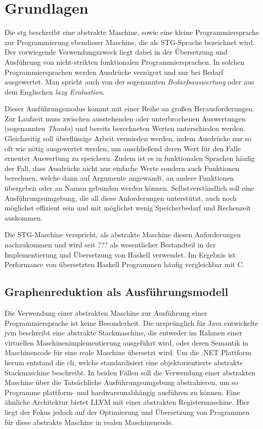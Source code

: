 
\chapter{Grundlagen}\label{chap:grundlagen}

Die \gls{stg} beschreibt eine abstrakte Maschine, sowie eine kleine Programmiersprache zur Programmierung ebendieser Maschine, die als STG-Sprache bezeichnet wird.
Der vorwiegende Verwendungszweck liegt dabei in der Übersetzung und Ausführung von nicht-strikten funktionalen Programmiersprachen.
In solchen Programmiersprachen werden Ausdrücke verzögert und nur bei Bedarf ausgewertet.
Man spricht auch von der sogenannten \textit{Bedarfsauswertung} oder aus dem Englischen \textit{lazy Evaluation}.

Dieser Ausführungsmodus kommt mit einer Reihe an großen Herausforderungen.
Zur Laufzeit muss zwischen ausstehenden oder unterbrochenen Auswertungen (sogenannten \textit{Thunks}) und bereits berechneten Werten unterschieden werden.
Gleichzeitig soll überflüssige Arbeit vermieden werden, indem Ausdrücke nur so oft wie nötig ausgewertet werden, um anschließend deren Wert für den Falle erneuter Auswertung zu speichern.
Zudem ist es in funktionalen Sprachen häufig der Fall, dass Ausdrücke nicht nur einfache Werte sondern auch Funktionen berechnen, welche dann auf Argumente angewandt, an andere Funktionen übergeben oder an Namen gebunden werden können.
Selbstverständlich soll eine Ausführungsumgebung, die all diese Anforderungen unterstützt, auch noch möglichst effizient sein und mit möglichst wenig Speicherbedarf und Rechenzeit auskommen.

Die STG-Maschine verspricht, als abstrakte Maschine diesen Anforderungen nachzukommen und wird seit ??? als  wesentlicher Bestandteil in der Implementierung und Übersetzung von Haskell verwendet.
Im Ergebnis ist Performance von übersetzten Haskell Programmen häufig vergleichbar mit C.\cn{}


\section{Graphenreduktion als Ausführungsmodell}

Die Verwendung einer abstrakten Maschine zur Ausführung einer Programmiersprache ist keine Besonderheit.
Die ursprünglich für Java entwickelte \gls{jvm} beschreibt eine abstrakte Stackmaschine, die entweder im Rahmen einer virtuellen Maschinenimplementierung ausgeführt wird, oder deren Semantik in Maschinencode für eine reale Maschine übersetzt wird.
Um die .NET Plattform herum entstand die \gls{cli}, welche standardisiert eine objektorientierte abstrakte Stackmaschine beschreibt.
In beiden Fällen soll die Verwendung einer abstrakten Maschine über die Tatsächliche Ausführungsumgebung abstrahieren, um so Programme plattform- und hardwareunabhängig ausführen zu können.
Eine ähnliche Architektur bietet LLVM mit einer abstrakten Registermaschine.
Hier liegt der Fokus jedoch auf der Optimierung und Übersetzung von Programmen für diese abstrakte Maschine in realen Maschinencode.

